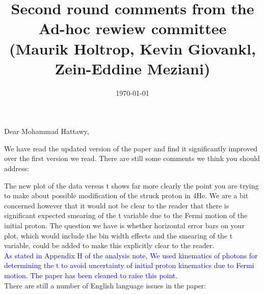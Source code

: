 \documentclass[a4paper,11pt,twoside]{article}
\title{Second round comments from the Ad-hoc rewiew committee \\
 (Maurik Holtrop, Kevin Giovankl, Zein-Eddine Meziani)}
\date{\today}
\begin{document}
\maketitle

\section*{}

Dear Mohammad Hattawy,

We have read the updated version of the paper and find it significantly 
improved over the first version we read. There are still some comments we think 
you should address:

The new plot of the data versus t shows far more clearly the point you are 
trying to make about possible modification of the struck proton in 4He. We are 
a bit concerned however that it would not be clear to the reader that there is 
significant expected smearing of the t variable due to the Fermi motion of the 
initial proton. The question we have is whether horizontal error bars on your 
plot, which would include the bin width effects and the smearing of the t 
variable, could be added to make this explicitly clear to the reader.\\
   \textcolor{blue}{As stated in Appendix H of the analysis note, We used 
   kinematics of photons for determining the t to avoid uncertainty of initial 
   proton kinematics due to Fermi motion. The paper has been cleaned to raise 
   this point. }\\

There are still a number of English language issues in the paper:\\
\end{document}
